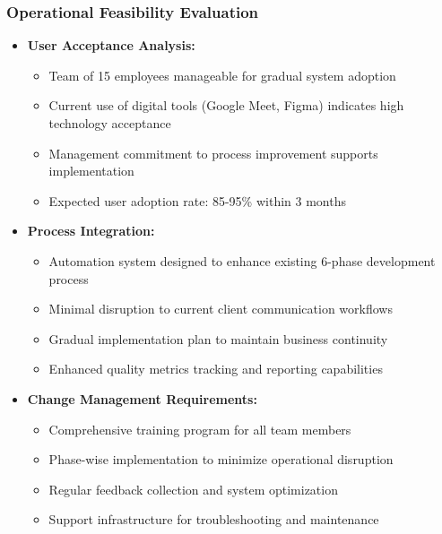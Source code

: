 \documentclass[12pt,a4paper]{article}
\begin{document}
\subsubsection{Operational Feasibility Evaluation}
\begin{itemize}
    \item \textbf{User Acceptance Analysis:}
    \begin{itemize}
        \item Team of 15 employees manageable for gradual system adoption
        \item Current use of digital tools (Google Meet, Figma) indicates high technology acceptance
        \item Management commitment to process improvement supports implementation
        \item Expected user adoption rate: 85-95\% within 3 months
    \end{itemize}
    
    \item \textbf{Process Integration:}
    \begin{itemize}
        \item Automation system designed to enhance existing 6-phase development process
        \item Minimal disruption to current client communication workflows
        \item Gradual implementation plan to maintain business continuity
        \item Enhanced quality metrics tracking and reporting capabilities
    \end{itemize}
    
    \item \textbf{Change Management Requirements:}
    \begin{itemize}
        \item Comprehensive training program for all team members
        \item Phase-wise implementation to minimize operational disruption
        \item Regular feedback collection and system optimization
        \item Support infrastructure for troubleshooting and maintenance
    \end{itemize}
\end{itemize}
\end{document}
